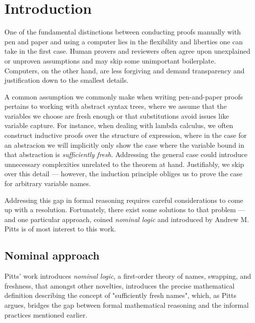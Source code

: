 \documentclass[english, mgr]{iithesis}
\author         {Dominik Gulczyński}
\date           {\today}                     %
\renewcommand{\it}[1]{\textit{#1}}
\begin{document}
\chapter{Introduction}
One of the fundamental distinctions between conducting proofs manually with pen and paper
and using a computer lies in the flexibility and liberties one can take in the first case.
Human provers and reviewers often agree upon unexplained or unproven assumptions
and may skip some unimportant boilerplate.
Computers, on the other hand, are less forgiving
and demand transparency and justification down to the smallest details.

A common assumption we commonly make when writing pen-and-paper proofs pertains to
working with abstract syntax trees,
where we assume that the variables we choose are fresh enough
or that substitutions avoid issues like variable capture.
For instance, when dealing with lambda calculus, we often construct inductive proofs
over the structure of expression, where in the case for an abstracion we will implicitly only show
the case where the variable bound in that abstraction is \it{sufficiently fresh}.
Addressing the general case could introduce unnecessary complexities unrelated to the theorem at hand.
Justifiably, we skip over this detail --- however, the induction principle obliges us to prove the case for arbitrary variable names.

Addressing this gap in formal reasoning requires careful considerations to come up with a resolution.
Fortunately, there exist some solutions to that problem --- and one particular
approach, coined \it{nominal logic} and introduced by Andrew M. Pitts\cite{pitts2003} is of most interest to this work.

\section{Nominal approach}
Pitts' work introduces \it{nominal logic}, a first-order theory of names, swapping, and freshness,
that amongst other novelties, introduces the precise mathematical definition
describing the concept of "sufficiently fresh names",
which, as Pitts argues, bridges the gap between formal mathematical reasoning and the informal practices mentioned earlier.
\end{document}

